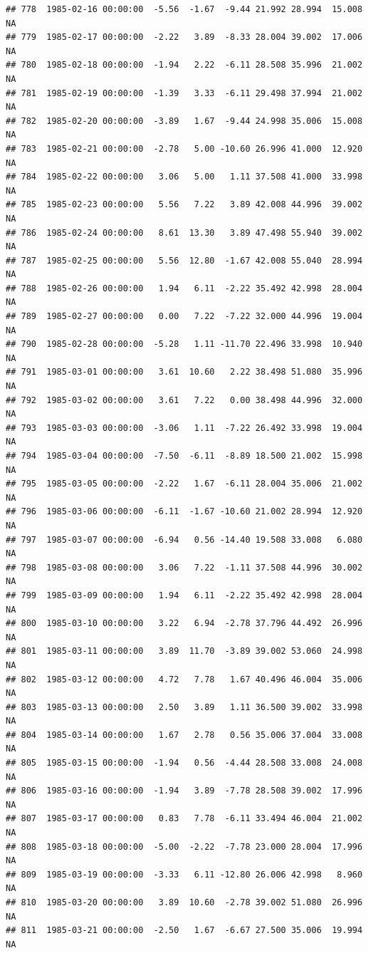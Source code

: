 \documentclass{article}\usepackage{graphicx, color}
\makeatletter
\newenvironment{kframe}{%
 \def\at@end@of@kframe{}%
 \ifinner\ifhmode%
  \def\at@end@of@kframe{\end{minipage}}%
  \begin{minipage}{\columnwidth}%
 \fi\fi%
 \def\FrameCommand##1{\hskip\@totalleftmargin \hskip-\fboxsep
 \colorbox{shadecolor}{##1}\hskip-\fboxsep
     \hskip-\linewidth \hskip-\@totalleftmargin \hskip\columnwidth}%
 \MakeFramed {\advance\hsize-\width
   \@totalleftmargin\z@ \linewidth\hsize
   \@setminipage}}%
 {\par\unskip\endMakeFramed%
 \at@end@of@kframe}
\newenvironment{knitrout}{}{} %
\makeatother
\begin{document}
\begin{knitrout}
\begin{kframe}
\begin{verbatim}
## 778  1985-02-16 00:00:00  -5.56  -1.67  -9.44 21.992 28.994  15.008     NA
## 779  1985-02-17 00:00:00  -2.22   3.89  -8.33 28.004 39.002  17.006     NA
## 780  1985-02-18 00:00:00  -1.94   2.22  -6.11 28.508 35.996  21.002     NA
## 781  1985-02-19 00:00:00  -1.39   3.33  -6.11 29.498 37.994  21.002     NA
## 782  1985-02-20 00:00:00  -3.89   1.67  -9.44 24.998 35.006  15.008     NA
## 783  1985-02-21 00:00:00  -2.78   5.00 -10.60 26.996 41.000  12.920     NA
## 784  1985-02-22 00:00:00   3.06   5.00   1.11 37.508 41.000  33.998     NA
## 785  1985-02-23 00:00:00   5.56   7.22   3.89 42.008 44.996  39.002     NA
## 786  1985-02-24 00:00:00   8.61  13.30   3.89 47.498 55.940  39.002     NA
## 787  1985-02-25 00:00:00   5.56  12.80  -1.67 42.008 55.040  28.994     NA
## 788  1985-02-26 00:00:00   1.94   6.11  -2.22 35.492 42.998  28.004     NA
## 789  1985-02-27 00:00:00   0.00   7.22  -7.22 32.000 44.996  19.004     NA
## 790  1985-02-28 00:00:00  -5.28   1.11 -11.70 22.496 33.998  10.940     NA
## 791  1985-03-01 00:00:00   3.61  10.60   2.22 38.498 51.080  35.996     NA
## 792  1985-03-02 00:00:00   3.61   7.22   0.00 38.498 44.996  32.000     NA
## 793  1985-03-03 00:00:00  -3.06   1.11  -7.22 26.492 33.998  19.004     NA
## 794  1985-03-04 00:00:00  -7.50  -6.11  -8.89 18.500 21.002  15.998     NA
## 795  1985-03-05 00:00:00  -2.22   1.67  -6.11 28.004 35.006  21.002     NA
## 796  1985-03-06 00:00:00  -6.11  -1.67 -10.60 21.002 28.994  12.920     NA
## 797  1985-03-07 00:00:00  -6.94   0.56 -14.40 19.508 33.008   6.080     NA
## 798  1985-03-08 00:00:00   3.06   7.22  -1.11 37.508 44.996  30.002     NA
## 799  1985-03-09 00:00:00   1.94   6.11  -2.22 35.492 42.998  28.004     NA
## 800  1985-03-10 00:00:00   3.22   6.94  -2.78 37.796 44.492  26.996     NA
## 801  1985-03-11 00:00:00   3.89  11.70  -3.89 39.002 53.060  24.998     NA
## 802  1985-03-12 00:00:00   4.72   7.78   1.67 40.496 46.004  35.006     NA
## 803  1985-03-13 00:00:00   2.50   3.89   1.11 36.500 39.002  33.998     NA
## 804  1985-03-14 00:00:00   1.67   2.78   0.56 35.006 37.004  33.008     NA
## 805  1985-03-15 00:00:00  -1.94   0.56  -4.44 28.508 33.008  24.008     NA
## 806  1985-03-16 00:00:00  -1.94   3.89  -7.78 28.508 39.002  17.996     NA
## 807  1985-03-17 00:00:00   0.83   7.78  -6.11 33.494 46.004  21.002     NA
## 808  1985-03-18 00:00:00  -5.00  -2.22  -7.78 23.000 28.004  17.996     NA
## 809  1985-03-19 00:00:00  -3.33   6.11 -12.80 26.006 42.998   8.960     NA
## 810  1985-03-20 00:00:00   3.89  10.60  -2.78 39.002 51.080  26.996     NA
## 811  1985-03-21 00:00:00  -2.50   1.67  -6.67 27.500 35.006  19.994     NA

\end{verbatim}
\end{kframe}
\end{knitrout}
\end{document}
